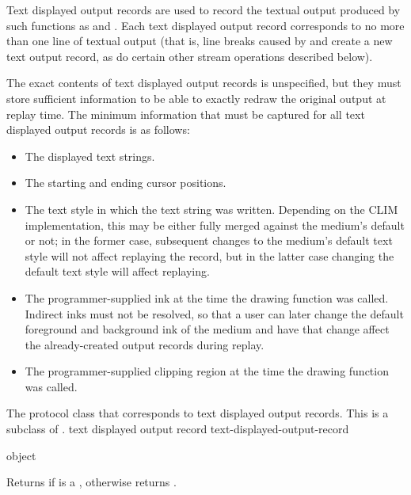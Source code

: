 Text displayed output records are used to record the textual output produced by
such functions as  and .  Each
text displayed output record corresponds to no more than one line of textual
output (that is, line breaks caused by  and  create a
new text output record, as do certain other stream operations described below).

The exact contents of text displayed output records is unspecified, but they
must store sufficient information to be able to exactly redraw the original
output at replay time.  The minimum information that must be captured for all
text displayed output records is as follows:

\begin{itemize}
\item The displayed text strings.

\item The starting and ending cursor positions.

\item The text style in which the text string was written.  Depending on the
CLIM implementation, this may be either fully merged against the medium's
default or not; in the former case, subsequent changes to the medium's default
text style will not affect replaying the record, but in the latter case changing
the default text style will affect replaying.

\item The programmer-supplied ink at the time the drawing function was called.
Indirect inks must not be resolved, so that a user can later change the default
foreground and background ink of the medium and have that change affect the
already-created output records during replay.

\item The programmer-supplied clipping region at the time the drawing function
was called.
\end{itemize}


The protocol class that corresponds to text displayed output records.  This is
a subclass of .
 {text displayed output record} {text-displayed-output-record}

 {object}

Returns  if  is a ,
otherwise returns .

